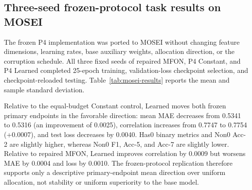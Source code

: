 \subsection{Three-seed frozen-protocol task results on
MOSEI}\label{mosei-frozen-protocol-results}

The frozen P4 implementation was ported to MOSEI without changing feature
dimensions, learning rates, base auxiliary weights, allocation direction, or
the corruption schedule. All three fixed seeds of repaired MFON, P4
Constant, and P4 Learned completed 25-epoch training, validation-loss
checkpoint selection, and checkpoint-reloaded testing.
Table~\ref{tab:mosei-results} reports the mean and sample standard deviation.

Relative to the equal-budget Constant control, Learned moves both frozen
primary endpoints in the favorable direction: mean MAE decreases from 0.5341
to 0.5316 (an improvement of 0.0025), correlation increases from 0.7747 to
0.7754 (+0.0007), and test loss decreases by 0.0040. Has0 binary metrics and
Non0 Acc-2 are slightly higher, whereas Non0 F1, Acc-5, and Acc-7 are slightly
lower. Relative to repaired MFON, Learned improves correlation by 0.0009 but
worsens MAE by 0.0004 and loss by 0.0010. The frozen-protocol replication
therefore supports only a descriptive primary-endpoint mean direction over
uniform allocation, not stability or uniform superiority to the base model.

